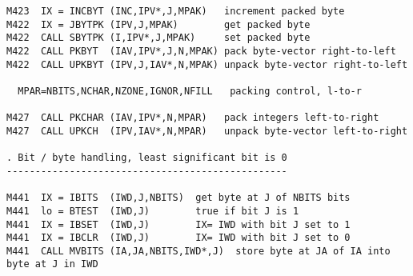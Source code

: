 \begin{verbatim}
M423  IX = INCBYT (INC,IPV*,J,MPAK)   increment packed byte
M422  IX = JBYTPK (IPV,J,MPAK)        get packed byte
M422  CALL SBYTPK (I,IPV*,J,MPAK)     set packed byte
M422  CALL PKBYT  (IAV,IPV*,J,N,MPAK) pack byte-vector right-to-left
M422  CALL UPKBYT (IPV,J,IAV*,N,MPAK) unpack byte-vector right-to-left

  MPAR=NBITS,NCHAR,NZONE,IGNOR,NFILL   packing control, l-to-r

M427  CALL PKCHAR (IAV,IPV*,N,MPAR)   pack integers left-to-right
M427  CALL UPKCH  (IPV,IAV*,N,MPAR)   unpack byte-vector left-to-right

. Bit / byte handling, least significant bit is 0
-------------------------------------------------

M441  IX = IBITS  (IWD,J,NBITS)  get byte at J of NBITS bits
M441  lo = BTEST  (IWD,J)        true if bit J is 1
M441  IX = IBSET  (IWD,J)        IX= IWD with bit J set to 1
M441  IX = IBCLR  (IWD,J)        IX= IWD with bit J set to 0
M441  CALL MVBITS (IA,JA,NBITS,IWD*,J)  store byte at JA of IA into byte at J in IWD
\end{verbatim}

